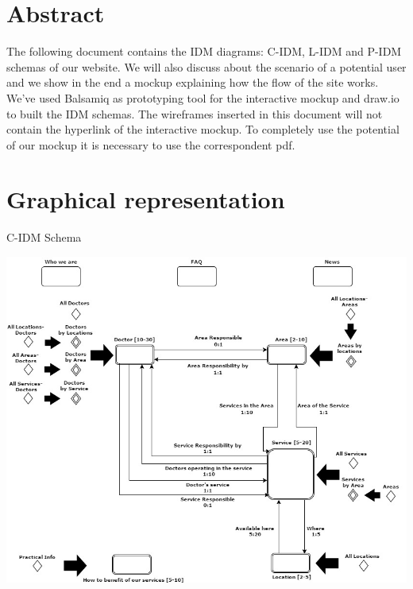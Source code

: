 \documentclass{../Common/Structure/doc_pdf}
\begin{document}
\titleToc

\chapter{Abstract}
\thispagestyle{fancy}
The following document contains the IDM diagrams: C-IDM, L-IDM and P-IDM schemas of our website. We will also discuss about the scenario of a potential user and we show in the end a mockup explaining how the flow of the site works. We've used Balsamiq as prototyping tool for the interactive mockup and draw.io to built the IDM schemas. The wireframes inserted in this document will not contain the hyperlink of the interactive mockup. To completely use the potential of our mockup it is necessary to use the correspondent pdf.

\chapter{Graphical representation}
\thispagestyle{fancy}

{\centering 
C-IDM Schema
\vspace{1cm}
\begin{center}
	\includegraphics[width=\textwidth]{Clinic_C_IDM.jpg}
\end{center}}

\newpage
\end{document}
